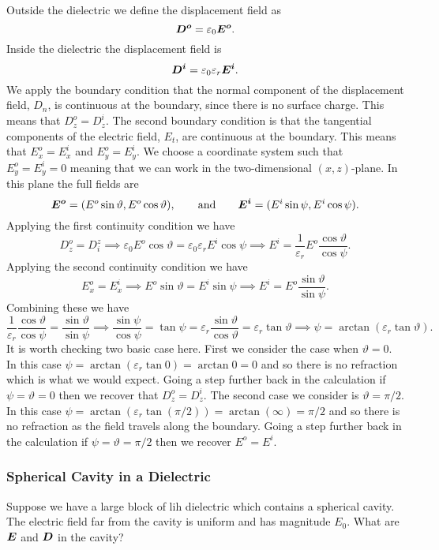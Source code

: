     Outside the dielectric we define the displacement field as
    \[\bm{D^o} = \varepsilon_0\bm{E^o}.\]
    Inside the dielectric the displacement field is
    \[\bm{D^i} = \varepsilon_0\varepsilon_r\bm{E^i}.\]
    We apply the boundary condition that the normal component of the displacement field, \(D_n\), is continuous at the boundary, since there is no surface charge.
    This means that \(D^o_z = D^i_z\).
    The second boundary condition is that the tangential components of the electric field, \(E_t\), are continuous at the boundary.
    This means that \(E^o_x = E^i_x\) and \(E^o_y = E^i_y\).
    We choose a coordinate system such that \(E^o_y = E^i_y = 0\) meaning that we can work in the two-dimensional \((x, z)\)-plane.
    In this plane the full fields are
    \[\bm{E^o} = (E^o\sin\vartheta, E^o\cos\vartheta), \qquad\text{and}\qquad \bm{E^i} = (E^i\sin\psi, E^i\cos\psi).\]
    Applying the first continuity condition we have
    \[D^o_z = D_i^z \implies \varepsilon_0E^o\cos\vartheta = \varepsilon_0\varepsilon_rE^i\cos\psi \implies E^i = \frac{1}{\varepsilon_r}E^o\frac{\cos\vartheta}{\cos\psi}.\]
    Applying the second continuity condition we have
    \[E^o_x = E^i_x \implies E^o\sin\vartheta = E^i\sin\psi \implies E^i = E^o\frac{\sin\vartheta}{\sin\psi}.\]
    Combining these we have
    \[\frac{1}{\varepsilon_r}\frac{\cos\vartheta}{\cos\psi} = \frac{\sin\vartheta}{\sin\psi} \implies \frac{\sin\psi}{\cos\psi} = \tan\psi = \varepsilon_r\frac{\sin\vartheta}{\cos\vartheta} = \varepsilon_r\tan\vartheta \implies \psi = \arctan(\varepsilon_r\tan\vartheta).\]
    It is worth checking two basic case here.
    First we consider the case when \(\vartheta = 0\).
    In this case \(\psi = \arctan(\varepsilon_r\tan 0) = \arctan 0 = 0\) and so there is no refraction which is what we would expect.
    Going a step further back in the calculation if \(\psi = \vartheta = 0\) then we recover that \(D^o_z = D^i_z\).
    The second case we consider is \(\vartheta = \pi/2\).
    In this case \(\psi = \arctan(\varepsilon_r\tan(\pi/2)) = \arctan(\infty) = \pi/2\) and so there is no refraction as the field travels along the boundary.
    Going a step further back in the calculation if \(\psi = \vartheta = \pi/2 \) then we recover \(E^o = E^i\).
    
    \subsubsection{Spherical Cavity in a Dielectric}
    Suppose we have a large block of \gls{lih} dielectric which contains a spherical cavity.
    The electric field far from the cavity is uniform and has magnitude \(E_0\).
    What are \(\bm{E}\) and \(\bm{D}\) in the cavity?
    
